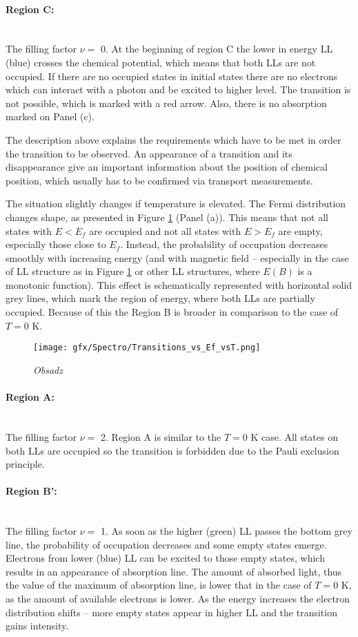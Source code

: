 \documentclass[titlepage,a4paper]{book}
\newcommand{\wciecie}{\quad\phantom{v}}
\newcommand{\myparagraph}[1]{\paragraph{#1}\mbox{}\\}
\begin{document}
\myparagraph{Region C:}
\wciecie
The filling factor $\nu =$ 0. At the beginning of region C the lower in energy LL (blue) crosses the chemical potential, which means that both LLs are not occupied. If there are no occupied states in initial states there are no electrons which can interact with a photon and be excited to higher level. The transition is not possible, which is marked with a red arrow. Also, there is no absorption marked on Panel (c).
 
The description above explains the requirements which have to be met in order the transition to be observed. An appearance of a transition and its disappearance give an important information about the position of chemical position, which usually has to be confirmed via transport measurements.

The situation slightly changes if temperature is elevated. The Fermi distribution changes shape, as presented in Figure \ref{fig:Transitions_vs_Ef_vsT} (Panel (a)). This means that not all states with $E < E_f$ are occupied and not all states with $E > E_f$ are empty, especially those close to $E_f$. Instead, the probability of occupation decreases smoothly with increasing energy (and with magnetic field -- especially in the case of LL structure as in Figure \ref{fig:Transitions_vs_Ef_vsT} or other LL structures, where $E(B)$ is a monotonic function). This effect is schematically represented with horizontal solid grey lines, which mark the region of energy, where both LLs are partially occupied. Because of this the Region B is broader in comparison to the case of $T = 0$ K.
\begin{figure}[ht]
	\centering
	\texttt{[image: gfx/Spectro/Transitions\_vs\_Ef\_vsT.png]}
	\vspace{-10pt}
	\caption{\textit{Obsadz}}
	\label{fig:Transitions_vs_Ef_vsT}
\end{figure}

\myparagraph{Region A:}
\wciecie
The filling factor $\nu =$ 2. Region A is similar to the $T = 0$ K case. All states on both LLs are occupied so the transition is forbidden due to the Pauli exclusion principle. 

\myparagraph{Region B':}
\wciecie
The filling factor $\nu =$ 1. As soon as the higher (green) LL passes the bottom grey line, the probability of occupation decreases and some empty states emerge. Electrons from lower (blue) LL can be excited to those empty states, which results in an appearance of absorption line. The amount of absorbed light, thus the value of the maximum of absorption line, is lower that in the case of $T = 0$ K, as the amount of available electrons is lower. As the energy increases the electron distribution shifts -- more empty states appear in higher LL and the transition gains intensity. 
\end{document}
